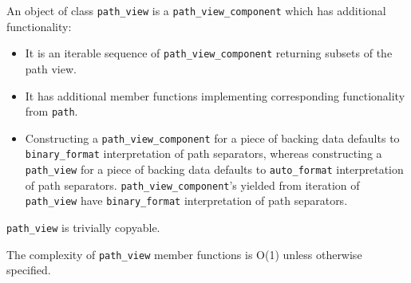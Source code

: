 \documentclass[11pt]{article}
\newcommand{\code}[2][cpp]{\lstinline[language=#1,basicstyle=\small\ttfamily]{#2}}
\begin{document}
An object of class \code{path_view} is a \code{path_view_component} which has additional functionality:
\begin{itemize}
    \item It is an iterable sequence of \code{path_view_component} returning subsets of the path view.
    \item It has additional member functions implementing corresponding functionality from \code{path}.
    \item Constructing a \code{path_view_component} for a piece of backing data defaults to \code{binary_format} interpretation of path separators, whereas constructing a \code{path_view} for a piece of backing data defaults to \code{auto_format} interpretation of path separators. \code{path_view_component}'s yielded from iteration of \code{path_view} have \code{binary_format} interpretation of path separators.
\end{itemize}

\code{path_view} is trivially copyable.

The complexity of \code{path_view} member functions is O(1) unless otherwise specified.
\end{document}
